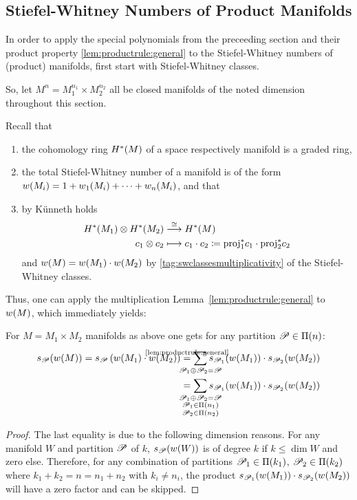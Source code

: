 \subsection{Stiefel-Whitney Numbers of Product Manifolds}
\label{sec:swnumsofproductmfds}
In order to apply the special polynomials from the preceeding section
and their product property \autoref{lem:productrule:general} to
the Stiefel-Whitney numbers of (product) manifolds, first start with
Stiefel-Whitney classes.

So, let $M^n=M_1^{n_1}\times M_2^{n_2}$ all be closed manifolds of the
noted dimension throughout this section.

Recall that
\begin{enumerate}
\item the cohomology ring $H^*(M)$ of a space respectively
  manifold is a graded ring,
\item the total Stiefel-Whitney number of a manifold is of the form
  ${w}(M_i) = 1 + {w_{1}}(M_i) + \dotsb + {w_{n}}(M_i)$, and that
\item by Künneth holds
  \begin{align*}
    H^*(M_1)\otimes H^*(M_2)
    &\overset{\cong}{\longrightarrow} H^*(M)
    \\
    c_1 \otimes c_2
    &\longmapsto c_1\cdot c_2
      \coloneqq {\mathrm{proj}}^*_1 c_1 \cdot {\mathrm{proj}}^*_2 c_2
  \end{align*}
  and ${w}(M) = {w}(M_1) \cdot {w}(M_2)$ by
  \ref{tag:swclassesmultiplicativity} of the Stiefel-Whitney classes.
\end{enumerate}
Thus, one can apply the multiplication
Lemma~\autoref{lem:productrule:general} to ${w}(M)$, which immediately
yields:
\begin{Cor}\label{cor:productrule:swcl}
  For $M=M_1\times M_2$ manifolds as above one gets for any partition
  $\mathscr{P}\in\Pi({n})$:
  \begin{align*}
    \s{\Part}(\W{M})
    =
    \s{\Part}\left(\W{M_1}\cdot \W{M_2}\right)
    &\cequalsby{\autoref{lem:productrule:general}}
      \sum_{\mathclap{\Part_1\concat\Part_2=\Part}}
      \s{\Part_1}(\W{M_1}) \cdot \s{\Part_2}(\W{M_2})
    \\ &=
         \sum_{\mathclap{\substack{
         \Part_1\concat\Part_2=\Part\\
    \Part_1\in\PartitionsOf{n_1}\\
    \Part_2\in\PartitionsOf{n_2}\\
    }}}
    \s{\Part_1}(\W{M_1}) \cdot \s{\Part_2}(\W{M_2})
  \end{align*}
  \begin{proof}
    The last equality is due to the following dimension reasons.
    For any manifold $W$ and partition $\mathscr{P}$ of $k$,
    $s_{\mathscr{P}}({w}(W))$ is of degree $k$ if $k\leq\dim W$ and zero else.
    Therefore, for any combination of partitions
    $\mathscr{P}_1\in\Pi({k_1})$,
    $\mathscr{P}_2\in\Pi({k_2})$
    where $k_1+k_2=n=n_1+n_2$ with $k_i\neq n_i$, the product
    $s_{\mathscr{P}_1}({w}(M_1))\cdot s_{\mathscr{P}_2}({w}(M_2))$ will have a zero
    factor and can be skipped.
  \end{proof}
\end{Cor}

